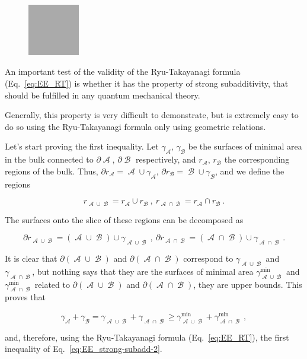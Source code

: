 \documentclass[twocolumn]{revtex4}
\providecommand{\eq}[2]{
    \begin{equation}
        #2
    \label{eq:#1}
    \end{equation}
}
\DeclareMathOperator{\calA}{\mathcal{A}}
\DeclareMathOperator{\calB}{\mathcal{B}}
\begin{document}
\begin{figure}
    \centering
    \includegraphics[width=0.2\textwidth]{../Imatges/empty.png}
\label{fig:}
\caption{}
\end{figure}

An important test of the validity of the Ryu-Takayanagi formula (Eq.~\ref{eq:EE_RT}) is whether it has the property of strong subadditivity, that should be fulfilled in any quantum mechanical theory.

Generally, this property is very difficult to demonstrate, but is extremely easy to do so using the Ryu-Takayanagi formula only using geometric relations.

Let's start proving the first inequality. Let $\gamma_{\calA}$, $\gamma_{\calB}$ be the surfaces of minimal area in the bulk connected to $\partial \calA$, $\partial \calB$ respectively, and $r_{\calA}$, $r_{\calB}$ the corresponding regions of the bulk. Thus, $\partial r_{\calA} = \calA \cup \gamma_{\calA}$, $\partial r_{\calB} = \calB \cup \gamma_{\calB}$, and we define the regions
\eq{SS_r-1}{
    r_{\calA \cup \calB} = r_{\calA} \cup r_{\calB} \ , \ r_{\calA \cap \calB} = r_{\calA} \cap r_{\calB} \ .
}
The surfaces onto the slice of these regions can be decomposed as
\eq{SS_dr-1}{
    \partial r_{\calA \cup \calB} = (\calA \cup \calB) \cup \gamma_{\calA \cup \calB} \ , \ \partial r_{\calA \cap \calB } = (\calA \cap \calB) \cup \gamma_{\calA \cap \calB} \ .
    }
It is clear that $\partial (\calA \cup \calB)$ and $\partial (\calA \cap \calB)$ correspond to $\gamma_{\calA \cup \calB}$ and $\gamma_{\calA \cap \calB}$, but nothing says that they are the surfaces of minimal area $\gamma^{\text{min}}_{\calA \cup \calB}$ and $\gamma^{\text{min}}_{\calA \cap \calB}$ related to $\partial (\calA \cup \calB)$ and $\partial (\calA \cap \calB)$, they are upper bounds. This proves that
\eq{SS_gamma-1}{
    \gamma_{\calA} + \gamma_{\calB} = \gamma_{\calA \cup \calB} + \gamma_{\calA \cap \calB} \ge \gamma^{\text{min}}_{\calA \cup \calB} + \gamma^{\text{min}}_{\calA \cap \calB} \ ,
}
and, therefore, using the Ryu-Takayanagi formula (Eq.~\ref{eq:EE_RT}), the first inequality of Eq.~\ref{eq:EE_strong-subadd-2}.
\end{document}
